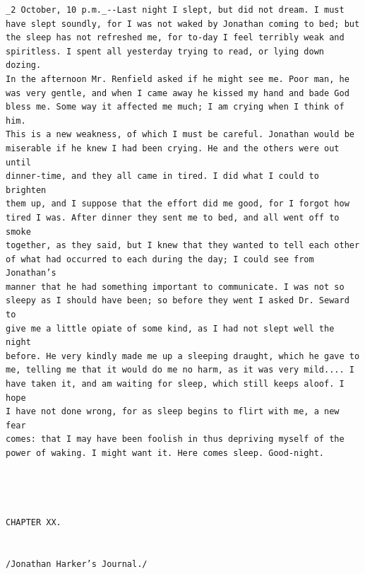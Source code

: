 \documentclass{article}
\begin{document}
\begin{verbatim}
_2 October, 10 p.m._--Last night I slept, but did not dream. I must
have slept soundly, for I was not waked by Jonathan coming to bed; but
the sleep has not refreshed me, for to-day I feel terribly weak and
spiritless. I spent all yesterday trying to read, or lying down dozing.
In the afternoon Mr. Renfield asked if he might see me. Poor man, he
was very gentle, and when I came away he kissed my hand and bade God
bless me. Some way it affected me much; I am crying when I think of him.
This is a new weakness, of which I must be careful. Jonathan would be
miserable if he knew I had been crying. He and the others were out until
dinner-time, and they all came in tired. I did what I could to brighten
them up, and I suppose that the effort did me good, for I forgot how
tired I was. After dinner they sent me to bed, and all went off to smoke
together, as they said, but I knew that they wanted to tell each other
of what had occurred to each during the day; I could see from Jonathan’s
manner that he had something important to communicate. I was not so
sleepy as I should have been; so before they went I asked Dr. Seward to
give me a little opiate of some kind, as I had not slept well the night
before. He very kindly made me up a sleeping draught, which he gave to
me, telling me that it would do me no harm, as it was very mild.... I
have taken it, and am waiting for sleep, which still keeps aloof. I hope
I have not done wrong, for as sleep begins to flirt with me, a new fear
comes: that I may have been foolish in thus depriving myself of the
power of waking. I might want it. Here comes sleep. Good-night.




CHAPTER XX.


/Jonathan Harker’s Journal./


\end{verbatim}
\end{document}
